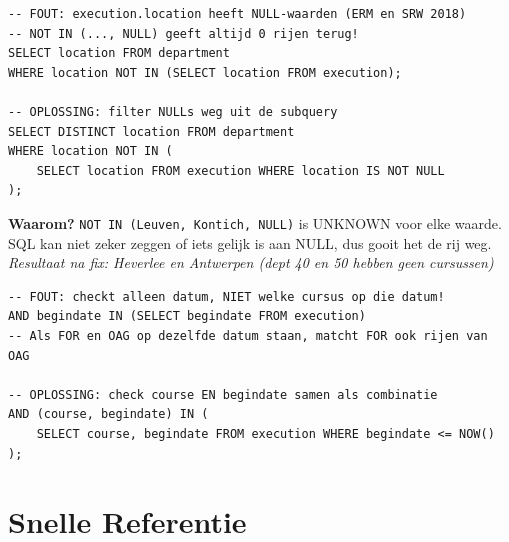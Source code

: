 \documentclass[10pt,a4paper]{article}
\begin{document}
\begin{tcolorbox}[warnbox,title=FOUT 3: NOT IN faalt bij NULLs in de subquery]
\begin{lstlisting}
-- FOUT: execution.location heeft NULL-waarden (ERM en SRW 2018)
-- NOT IN (..., NULL) geeft altijd 0 rijen terug!
SELECT location FROM department
WHERE location NOT IN (SELECT location FROM execution);

-- OPLOSSING: filter NULLs weg uit de subquery
SELECT DISTINCT location FROM department
WHERE location NOT IN (
    SELECT location FROM execution WHERE location IS NOT NULL
);
\end{lstlisting}
\textbf{Waarom?} \texttt{NOT IN (Leuven, Kontich, NULL)} is UNKNOWN voor elke waarde.
SQL kan niet zeker zeggen of iets gelijk is aan NULL, dus gooit het de rij weg.\\[2pt]
\textit{Resultaat na fix: Heverlee en Antwerpen (dept 40 en 50 hebben geen cursussen)}
\end{tcolorbox}

\begin{tcolorbox}[warnbox,title=FOUT 4: Samengestelde FK checken met 1 kolom]
\begin{lstlisting}
-- FOUT: checkt alleen datum, NIET welke cursus op die datum!
AND begindate IN (SELECT begindate FROM execution)
-- Als FOR en OAG op dezelfde datum staan, matcht FOR ook rijen van OAG

-- OPLOSSING: check course EN begindate samen als combinatie
AND (course, begindate) IN (
    SELECT course, begindate FROM execution WHERE begindate <= NOW()
);
\end{lstlisting}
\end{tcolorbox}

\section{Snelle Referentie}
\end{document}
